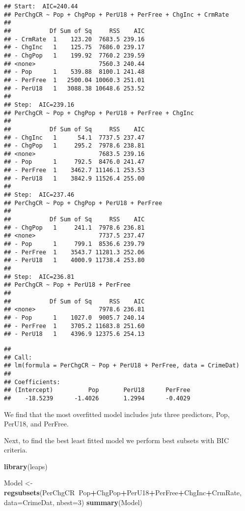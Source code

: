 \documentclass[]{article}
\newenvironment{Shaded}{\begin{snugshade}}{\end{snugshade}}
\newcommand{\KeywordTok}[1]{\textcolor[rgb]{0.13,0.29,0.53}{\textbf{#1}}}
\newcommand{\DataTypeTok}[1]{\textcolor[rgb]{0.13,0.29,0.53}{#1}}
\newcommand{\DecValTok}[1]{\textcolor[rgb]{0.00,0.00,0.81}{#1}}
\newcommand{\StringTok}[1]{\textcolor[rgb]{0.31,0.60,0.02}{#1}}
\newcommand{\OperatorTok}[1]{\textcolor[rgb]{0.81,0.36,0.00}{\textbf{#1}}}
\newcommand{\NormalTok}[1]{#1}
\begin{document}
\begin{verbatim}
## Start:  AIC=240.44
## PerChgCR ~ Pop + ChgPop + PerU18 + PerFree + ChgInc + CrmRate
## 
##           Df Sum of Sq     RSS    AIC
## - CrmRate  1    123.20  7683.5 239.16
## - ChgInc   1    125.75  7686.0 239.17
## - ChgPop   1    199.92  7760.2 239.59
## <none>                  7560.3 240.44
## - Pop      1    539.88  8100.1 241.48
## - PerFree  1   2500.04 10060.3 251.01
## - PerU18   1   3088.38 10648.6 253.52
## 
## Step:  AIC=239.16
## PerChgCR ~ Pop + ChgPop + PerU18 + PerFree + ChgInc
## 
##           Df Sum of Sq     RSS    AIC
## - ChgInc   1      54.1  7737.5 237.47
## - ChgPop   1     295.2  7978.6 238.81
## <none>                  7683.5 239.16
## - Pop      1     792.5  8476.0 241.47
## - PerFree  1    3462.7 11146.1 253.53
## - PerU18   1    3842.9 11526.4 255.00
## 
## Step:  AIC=237.46
## PerChgCR ~ Pop + ChgPop + PerU18 + PerFree
## 
##           Df Sum of Sq     RSS    AIC
## - ChgPop   1     241.1  7978.6 236.81
## <none>                  7737.5 237.47
## - Pop      1     799.1  8536.6 239.79
## - PerFree  1    3543.7 11281.3 252.06
## - PerU18   1    4000.9 11738.4 253.80
## 
## Step:  AIC=236.81
## PerChgCR ~ Pop + PerU18 + PerFree
## 
##           Df Sum of Sq     RSS    AIC
## <none>                  7978.6 236.81
## - Pop      1    1027.0  9005.7 240.14
## - PerFree  1    3705.2 11683.8 251.60
## - PerU18   1    4396.9 12375.6 254.13
\end{verbatim}

\begin{verbatim}
## 
## Call:
## lm(formula = PerChgCR ~ Pop + PerU18 + PerFree, data = CrimeDat)
## 
## Coefficients:
## (Intercept)          Pop       PerU18      PerFree  
##    -18.5239      -1.4026       1.2994      -0.4029
\end{verbatim}

We find that the most overfitted model includes juts three predictors,
Pop, PerU18, and PerFree.

Next, to find the best least fitted model we perform best subsets with
BIC criteria.

\begin{Shaded}
\begin{Highlighting}[]
\KeywordTok{library}\NormalTok{(leaps)}

\NormalTok{Model <-}\StringTok{ }\KeywordTok{regsubsets}\NormalTok{(PerChgCR}\OperatorTok{~}\NormalTok{Pop}\OperatorTok{+}\NormalTok{ChgPop}\OperatorTok{+}\NormalTok{PerU18}\OperatorTok{+}\NormalTok{PerFree}\OperatorTok{+}\NormalTok{ChgInc}\OperatorTok{+}\NormalTok{CrmRate, }\DataTypeTok{data=}\NormalTok{CrimeDat, }\DataTypeTok{nbest=}\DecValTok{3}\NormalTok{)}
\KeywordTok{summary}\NormalTok{(Model)}
\end{Highlighting}
\end{Shaded}
\end{document}

